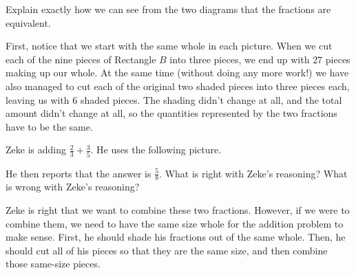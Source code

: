 \documentclass[nooutcomes]{ximera}
\begin{document}
\begin{problem}
\begin{problem}
\begin{problem}
 \begin{problem}
 Explain exactly how we can see from the two diagrams that the fractions are equivalent.
 \begin{freeResponse}
 \begin{hint}
 First, notice that we start with the same whole in each picture.  When we cut each of the nine pieces of Rectangle $B$ into three pieces, we end up with $27$ pieces making up our whole.  At the same time (without doing any more work!) we have also managed to cut each of the original two shaded pieces into three pieces each, leaving us with $6$ shaded pieces.  The shading didn't change at all, and the total amount didn't change at all, so the quantities represented by the two fractions have to be the same.
 \end{hint}
 \end{freeResponse}
 
 
\end{problem}
\end{problem}
\end{problem}
\end{problem}




\begin{problem}

Zeke is adding $\frac	{2}{3} + \frac{3}{5}$.  He uses the following picture.

\begin{center}\end{center}

He then reports that the answer is $\frac{5}{8}$.  What is right with Zeke's reasoning?  What is wrong with Zeke's reasoning?

\begin{freeResponse}
\begin{hint}
	Zeke is right that we want to combine these two fractions.  However, if we were to combine them, we need to have the same size whole for the addition problem to make sense.  First, he should shade his fractions out of the same whole.  Then, he should cut all of his pieces so that they are the same size, and then combine those same-size pieces.
\end{hint}
\end{freeResponse}

\end{problem}
\end{document}
